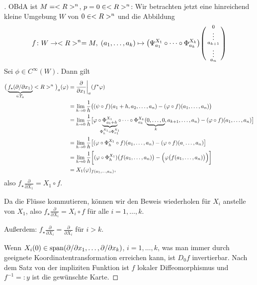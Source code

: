 \begin{proof}[]
	OBdA ist $M=<R>^n$, $p=0\in<R>^n$: Wir betrachten jetzt eine hinreichend kleine Umgebung $W$ von $0\in<R>^n$ und die Abbildung \begin{align*}
		f\colon W\to <R>^n = M,\;(a_1,\dots,a_k)\mapsto \big(\Psi_{a_1}^{X_1}\circ\dots\circ\Phi_{a_k}^{X_k}\big)\begin{psmallmatrix}
			0\\ \vdots \\ a_{k+1} \\ \vdots \\ a_n
		\end{psmallmatrix}
	\end{align*}
	Sei $\phi\in C^\infty(W)$. Dann gilt \begin{align*}
		\big(\underbrace{f_\star(\partial\slash\partial x_1)}_{\in T_a} \R^n\big)_a(\phi) &= \frac{\partial}{\partial x_1}\bigg|_a (f^\star \phi) \\
			&= \lim\limits_{h\to 0} \frac 1h \big((\psi\circ f)(a_1+h,a_2,\dots,a_n) - (\phi\circ f)(a_1,\dots,a_n)\big) \\
			&=\lim\limits_{h\to 0}\frac 1h \big[ \phi\circ \underbrace{\Phi_{a_1+h}^{X_1}}_{\mathclap{\Phi_h^{X_1}\circ\Phi_{a_1}^{X_1}}} \circ\dots\circ \Phi_{a_k}^{X_k}(\underbrace{0,\dots,0}_{k},a_{k+1},\dots,a_n) - (\phi\circ f)(a_1,\dots,a_n)\big] \\
			&=\lim\limits_{h\to 0} \frac1h\big[ (\phi\circ\Phi_h^{X_1}\circ f)(a_1,\dots,a_n) - (\phi\circ f)(a_,\dots,a_n)\big] \\
			&=\lim\limits_{h\to 0}\frac 1h\bigg[ (\phi\circ\Phi_h^{X_1})\big(f(a_1,\dots,a_n)\big) - \Big(\phi\big(f(a_1,\dots,a_n)\big)\Big)\bigg] \\
			&= X_1(\phi)_{f(a_1,\dots,a_n)},
	\end{align*}
	also $f_\star \frac{\partial}{\partial X_1} = X_1\circ f$.
	
	Da die Flüsse kommutieren, können wir den Beweis wiederholen für $X_i$ anstelle von $X_1$, also $f_\star \frac{\partial}{\partial X_i} = X_i\circ f$ für alle $i=1,\dots,k$.
	
	Außerdem: $f_\star \frac{\partial}{\partial X_i} = \frac{\partial}{\partial X_i}$ für $i> k$.
	
	Wenn $X_i(0)\in\operatorname{span}(\partial\slash\partial x_1,\dots,\partial\slash\partial x_k)$, $i=1,\dots,k$, was man immer durch geeignete Koordinatentransformation erreichen kann, ist $D_0 f$ invertierbar. Nach dem Satz von der impliziten Funktion ist $f$ lokaler Diffeomorphismus und $f^{-1} =: y$ ist die gewünschte Karte.
\end{proof}

